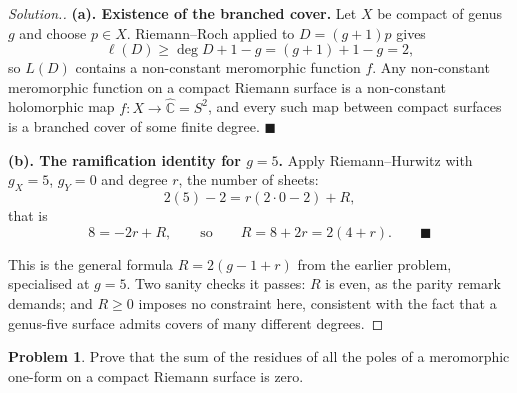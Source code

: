 \documentclass[11pt,a4paper]{article}
\theoremstyle{definition}
\newtheorem{problemx}{Problem}[section]
\newenvironment{problem}{\begin{problemx}}{\end{problemx}}
\newenvironment{solution}
  {\renewcommand{\qedsymbol}{}\begin{proof}[\textit{Solution}.]}
  {\end{proof}}
\begin{document}
\begin{solution}
\textbf{(a). Existence of the branched cover.} Let $X$ be compact of genus $g$ and
choose $p \in X$. Riemann--Roch applied to $D = (g+1)p$ gives
$$\ell(D) \geq \deg D + 1 - g = (g+1)+1-g = 2 ,$$
so $L(D)$ contains a non-constant meromorphic function $f$. Any non-constant
meromorphic function on a compact Riemann surface is a non-constant holomorphic
map $f : X \rightarrow \widehat{\mathbb{C}} = S^{2}$, and every such map between
compact surfaces is a branched cover of some finite degree. $\blacksquare$

\textbf{(b). The ramification identity for $g = 5$.} Apply Riemann--Hurwitz with
$g_X = 5$, $g_Y = 0$ and degree $r$, the number of sheets:
$$2(5) - 2 = r\left(2\cdot 0 - 2\right) + R ,$$
that is
$$8 = -2r + R,\qquad\text{so}\qquad R = 8 + 2r = \boxed{2(4+r)} . \qquad\blacksquare$$

This is the general formula $R = 2(g-1+r)$ from the earlier problem, specialised at
$g = 5$. Two sanity checks it passes: $R$ is even, as the parity remark demands;
and $R \geq 0$ imposes no constraint here, consistent with the fact that a
genus-five surface admits covers of many different degrees.
\end{solution}


\begin{problem}
Prove that the sum of the residues of all the poles of a meromorphic one-form on
a compact Riemann surface is zero.
\end{problem}
\end{document}
